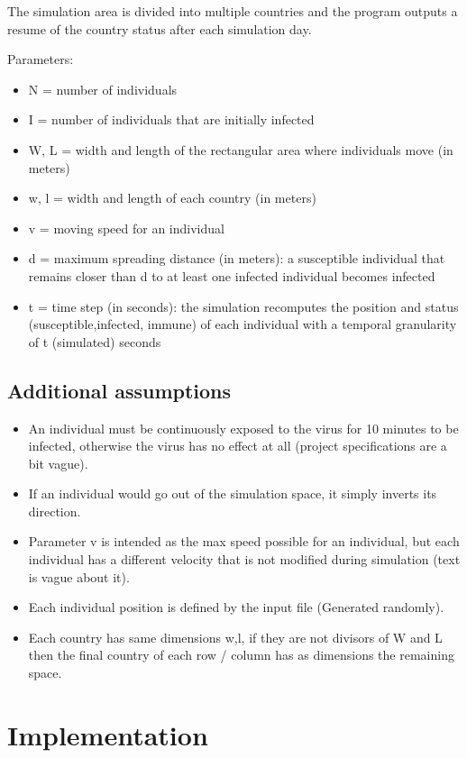 \documentclass[10pt]{article}
\begin{document}
	The simulation area is divided into multiple countries and the program outputs a resume of the country status after each simulation day.
	
	Parameters:
	\begin{itemize}
		\item N = number of individuals
		\item I = number of individuals that are initially infected
		\item W, L = width and length of the rectangular area where individuals move (in meters)
		\item w, l = width and length of each country (in meters)
		\item v = moving speed for an individual
		\item d = maximum spreading distance (in meters): a susceptible individual that remains closer than d to at least one infected individual becomes infected
		\item t = time step (in seconds): the simulation recomputes the position and status (susceptible,infected, immune) of each individual with a temporal granularity of t (simulated) seconds
	\end{itemize}

	\subsection{Additional assumptions} \label{assumptions}
	\begin{itemize}
		\item An individual must be continuously exposed to the virus for 10 minutes to be infected, otherwise the virus has no effect at all (project specifications are a bit vague).
		\item If an individual would go out of the simulation space, it simply inverts its direction.
		\item Parameter v is intended as the max speed possible for an individual, but each individual has a different velocity that is not modified during simulation (text is vague about it).
		\item Each individual position is defined by the input file (Generated randomly).
		\item Each country has same dimensions w,l, if they are not divisors of W and L then the final country of each row / column has as dimensions the remaining space. 
	\end{itemize}
	
	\section{Implementation}
\end{document}

